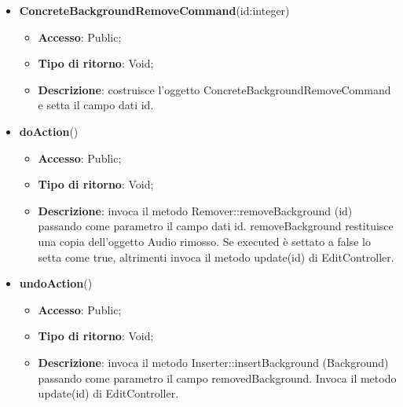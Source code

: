 {{{	
	\begin{itemize}
		\item \textbf{ConcreteBackgroundRemoveCommand}(id:integer)
		\begin{itemize}
			\item \textbf{Accesso}: Public;
			\item \textbf{Tipo di ritorno}: Void;
			\item \textbf{Descrizione}: costruisce l’oggetto ConcreteBackgroundRemoveCommand e setta il campo dati id.
		\end{itemize}
		\item \textbf{doAction}()
		\begin{itemize}
			\item \textbf{Accesso}: Public;
			\item \textbf{Tipo di ritorno}: Void;
			\item \textbf{Descrizione}: invoca il metodo Remover::removeBackground (id) passando come parametro il campo dati id. removeBackground restituisce una copia dell’oggetto Audio rimosso. Se executed è settato a false lo setta come true, altrimenti invoca il metodo update(id) di EditController.
		\end{itemize}
		\item \textbf{undoAction}()
		\begin{itemize}
			\item \textbf{Accesso}: Public;
			\item \textbf{Tipo di ritorno}: Void;
			\item \textbf{Descrizione}: invoca il metodo Inserter::insertBackground (Background) passando come parametro il campo removedBackground. Invoca il metodo update(id) di EditController.
		\end{itemize}
	\end{itemize}
	}
}}
